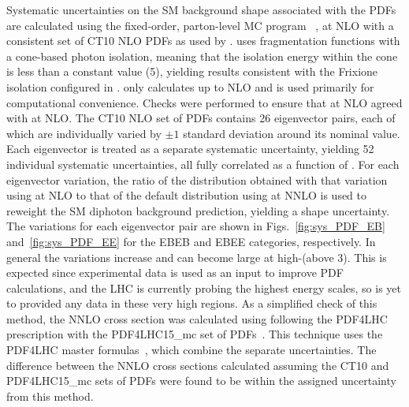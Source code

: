 Systematic uncertainties on the SM background shape associated with the PDFs are calculated using the fixed-order, parton-level MC program \DIPHOX~\cite{Binoth:1999qq}, at NLO with a consistent set of CT10 NLO PDFs as used by \MCFM. \DIPHOX uses fragmentation functions with a cone-based photon isolation, meaning that the isolation energy within the cone is less than a constant value (5\GeV), yielding results consistent with the Frixione isolation configured in \MCFM. \DIPHOX only calculates up to NLO and is used primarily for computational convenience. Checks were performed to ensure that \DIPHOX at NLO agreed with \MCFM at NLO. The CT10 NLO set of PDFs contains 26 eigenvector pairs, each of which are individually varied by $\pm1$ standard deviation around its nominal value. Each eigenvector is treated as a separate systematic uncertainty, yielding 52 individual systematic uncertainties, all fully correlated as a function of \mgg. For each eigenvector variation, the ratio of the \mgg distribution obtained with that variation using \DIPHOX at NLO to that of the default distribution using \MCFM at NNLO is used to reweight the \MCFM SM diphoton background prediction, yielding a shape uncertainty. The variations for each eigenvector pair are shown in Figs.~\ref{fig:sys_PDF_EB} and~\ref{fig:sys_PDF_EE} for the EBEB and EBEE categories, respectively. In general the variations increase and can become large at high-\mgg (above 3\TeV). This is expected since experimental data is used as an input to improve PDF calculations, and the LHC is currently probing the highest energy scales, so is yet to provided any data in these very high regions. As a simplified check of this method, the NNLO cross section was calculated using \MCFM following the PDF4LHC prescription with the PDF4LHC15\_mc set of PDFs~\cite{Butterworth:2015oua}. This technique uses the PDF4LHC master formulas~\cite{Butterworth:2015oua}, which combine the separate uncertainties. The difference between the NNLO cross sections calculated assuming the CT10 and PDF4LHC15\_mc sets of PDFs were found to be within the assigned uncertainty from this method.

